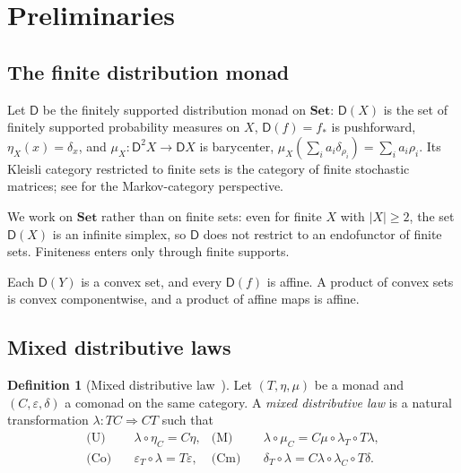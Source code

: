\documentclass[11pt]{article}
\theoremstyle{definition}
\newtheorem{definition}[theorem]{Definition}
\theoremstyle{remark}
\newcommand{\D}{\mathsf{D}}
\newcommand{\Set}{\mathbf{Set}}
\begin{document}
\section{Preliminaries}

\subsection{The finite distribution monad}

Let $\D$ be the finitely supported distribution monad on $\Set$: $\D(X)$ is the set of finitely
supported probability measures on $X$, $\D(f)=f_*$ is pushforward, $\eta_X(x)=\delta_x$, and
$\mu_X\colon \D^2X\to\D X$ is barycenter, $\mu_X(\sum_i a_i\delta_{\rho_i})=\sum_i a_i\rho_i$. Its
Kleisli category restricted to finite sets is the category of finite stochastic matrices; see
\cite{Fritz2020,FGPR2023} for the Markov-category perspective.

We work on $\Set$ rather than on finite sets: even for finite $X$ with $|X|\ge 2$, the set $\D(X)$ is
an infinite simplex, so $\D$ does not restrict to an endofunctor of finite sets. Finiteness enters
only through finite supports.

Each $\D(Y)$ is a convex set, and every $\D(f)$ is affine. A product of convex sets is convex
componentwise, and a product of affine maps is affine.

\subsection{Mixed distributive laws}

\begin{definition}[Mixed distributive law~\cite{Beck1969,PowerWatanabe2002}]\label{def:mixed}
Let $(T,\eta,\mu)$ be a monad and $(C,\varepsilon,\delta)$ a comonad on the same category. A
\emph{mixed distributive law} is a natural transformation $\lambda\colon TC\Rightarrow CT$ such that
\begin{align*}
\text{(U)}\quad & \lambda\circ\eta_{C} = C\eta, &
\text{(M)}\quad & \lambda\circ\mu_{C} = C\mu\circ\lambda_{T}\circ T\lambda,\\
\text{(Co)}\quad & \varepsilon_{T}\circ\lambda = T\varepsilon, &
\text{(Cm)}\quad & \delta_{T}\circ\lambda = C\lambda\circ\lambda_{C}\circ T\delta.
\end{align*}
\end{definition}
\end{document}
